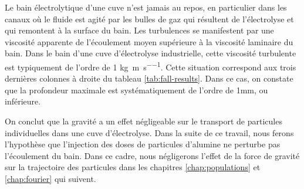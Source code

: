 \begin{remarque}

  Le bain électrolytique d'une cuve n'est jamais au repos, en
  particulier dans les canaux où le fluide est agité par les bulles de
  gaz qui résultent de l'électrolyse et qui remontent à la surface du
  bain. Les turbulences se manifestent par une viscosité apparente de
  l'écoulement moyen supérieure à la viscosité laminaire du bain. Dans
  le bain d'une cuve d'électrolyse industrielle, cette viscosité
  turbulente est typiquement de l'ordre de \num{1}
  \si{\kilo\gram\per\meter\per\second}. Cette situation correspond aux
  trois dernières colonnes à droite du tableau
  \ref{tab:fall-results}. Dans ce cas, on constate que la profondeur
  maximale est systématiquement de l'ordre de
  \num{1}\si{\milli\meter}, ou inférieure.

  On conclut que la gravité a un effet négligeable sur le transport de
  particules individuelles dans une cuve d'électrolyse. Dans la suite
  de ce travail, nous ferons l'hypothèse que l'injection des doses de
  particules d'alumine ne perturbe pas l'écoulement du bain. Dans ce
  cadre, nous négligerons l'effet de la force de gravité sur la
  trajectoire des particules dans les chapitres \ref{chap:populations}
  et \ref{chap:fourier} qui suivent.
\end{remarque}
